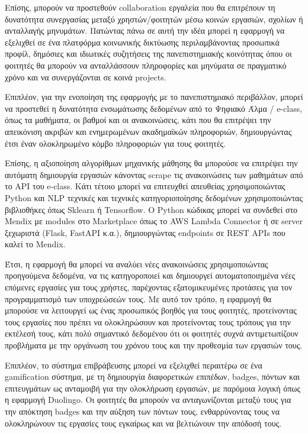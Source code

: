         Επίσης, μπορούν να προστεθούν collaboration εργαλεία που θα επιτρέπουν τη δυνατότητα συνεργασίας μεταξύ χρηστών/φοιτητών μέσω κοινών εργασιών, σχολίων ή ανταλλαγής μηνυμάτων. Πατώντας πάνω σε αυτή την ιδέα μπορεί η εφαρμογή να εξελιχθεί σε ένα πλατφόρμα κοινωνικής δικτύωσης περιλαμβάνοντας προσωπικά προφίλ, δημόσιες και ιδιωτικές συζητήσεις της πανεπιστημιακής κοινότητας όπου οι φοιτητές θα μπορούν να ανταλλάσσουν πληροφορίες και μηνύματα σε πραγματικό χρόνο και να συνεργάζονται σε κοινά projects.

        Επιπλέον, για την ενοποίηση της εφαρμογής με το πανεπιστημιακό περιβάλλον, μπορεί να προστεθεί η δυνατότητα ενσωμάτωσης δεδομένων από το Ψηφιακό Άλμα / e-class, όπως τα μαθήματα, οι βαθμοί και οι ανακοινώσεις, κάτι που θα επιτρέψει την απεικόνιση ακριβών και ενημερωμένων ακαδημαϊκών πληροφοριών, δημιουργώντας έτσι έναν ολοκληρωμένο κόμβο πληροφοριών για τους φοιτητές.

        Επίσης, η αξιοποίηση αλγορίθμων μηχανικής μάθησης θα μπορούσε να επιτρέψει την αυτόματη δημιουργία εργασιών κάνοντας scrape τις ανακοινώσεις των μαθημάτων από το API του e-class. Κάτι τέτοιο μπορεί να επιτευχθεί απευθείας χρησιμοποιώντας Python και NLP τεχνικές και τεχνικές κατηγοριοποίησης δεδομένων χρησιμοποιώντας βιβλιοθήκες όπως Sklearn ή Tensorflow. Ο Python κώδικας μπορεί να συνδεθεί στο Mendix με modules στο Marketplace όπως το AWS Lambda Connector ή σε server ξεχωριστά (Flask, FastAPI κ.α.), δημιουργώντας endpoints σε REST APIs που καλεί το Mendix.

        Έτσι, η εφαρμογή θα μπορεί να αναλύει νέες ανακοινώσεις χρησιμοποιώντας προηγούμενα δεδομένα, να τις κατηγοροποιεί και δημιουργεί αυτοματοποιημένα νέες επόμενες εργασίες για τους χρήστες, παρέχοντας εξατομικευμένες προτάσεις για τον προγραμματισμό των υποχρεώσεών τους. Με αυτό τον τρόπο, η εφαρμογή θα μπορούσε να λειτουργεί ως ένας προσωπικός βοηθός για τους φοιτητές, προτείνοντας τους εργασίες που πρέπει να ολοκληρώσουν και προτείνοντας τους τρόπους για την εκτέλεσή τους, κάτι πολύ σημαντικό δεδομένου ότι οι φοιτητές συχνά αντιμετωπίζουν προβλήματα με την οργάνωση του χρόνου τους και την προθεσμία των εργασιών τους.

        Επιπλέον, το σύστημα επιβράβευσης μπορεί να εξελιχθεί περαιτέρω σε ένα gamification σύστημα, με τη δημιουργία διαφορετικών επιπέδων, badges, πόντων και επιτευγμάτων ως ανταμοιβή για την ολοκλήρωση εργασιών, με παρόμοια λογική όπως η εφαρμογή Duolingo. Οι φοιτητές θα μπορούν να ανταγωνίζονται μεταξύ τους για την απόκτηση badges και την αύξηση των πόντων τους, ενθαρρύνοντας τους να ολοκληρώνουν τις εργασίες τους εγκαίρως και να βελτιώνουν την απόδοσή τους.

